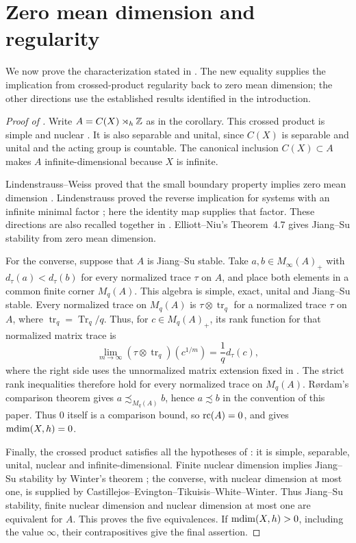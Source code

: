 \section{Zero mean dimension and regularity}
\label{sec:regularity-proof}

We now prove the characterization stated in .
The new equality supplies the implication from crossed-product
regularity back to zero mean dimension; the other directions use the
established results identified in the introduction.

\begin{proof}[Proof of ]
Write $A=C(X)\rtimes_h\mathbb Z$ as in the corollary. This crossed product
is simple and nuclear
\cite[Section~3]{ElliottNiu2017}. It is also separable and unital, since
\(C(X)\) is separable and unital and the acting group is countable.
The canonical inclusion \(C(X)\subset A\) makes \(A\)
infinite-dimensional because \(X\) is infinite.

Lindenstrauss--Weiss proved that the small boundary property implies
zero mean dimension \cite[Theorem~5.4]{LindenstraussWeiss2000}.
Lindenstrauss proved the reverse implication for systems with an infinite
minimal factor \cite[Theorem~6.2]{Lindenstrauss1999}; here the identity
map supplies that factor. These directions are also recalled together
in \cite[Theorem~2.3]{ElliottNiu2017}. Elliott--Niu's Theorem~4.7 gives
Jiang--Su stability from zero mean dimension.

For the converse, suppose that \(A\) is Jiang--Su stable. Take
\(a,b\in M_\infty(A)_+\) with \(d_\tau(a)<d_\tau(b)\) for every
normalized trace \(\tau\) on \(A\), and place both elements in a common
finite corner \(M_q(A)\). This algebra is simple, exact, unital and
Jiang--Su stable. Every normalized trace on \(M_q(A)\) is
\(\tau\otimes\operatorname{tr}_q\) for a normalized trace \(\tau\) on
\(A\), where \(\operatorname{tr}_q=\operatorname{Tr}_q/q\). Thus, for
\(c\in M_q(A)_+\), its rank function for that normalized matrix trace is
\[
\lim_{m\to\infty}(\tau\otimes\operatorname{tr}_q)(c^{1/m})
   =\frac1q d_\tau(c),
\]
where the right side uses the unnormalized matrix extension fixed in
. The strict rank inequalities therefore
hold for every normalized trace on \(M_q(A)\). R\o rdam's comparison
theorem \cite[Corollary~4.6]{Rordam2004} gives
\(a\precsim_{M_q(A)}b\), hence \(a\precsim b\) in the convention of this
paper. Thus \(0\) itself is a comparison bound, so \(\operatorname{rc}(A)=0\), and
 gives
\(\operatorname{mdim}(X,h)=0\).

Finally, the crossed product satisfies all the hypotheses of
\cite[Theorems~A and~B]{CastillejosEvingtonTikuisisWhiteWinter2021}:
it is simple, separable, unital, nuclear and infinite-dimensional.
Finite nuclear dimension implies Jiang--Su stability by Winter's theorem
\cite{Winter2012}; the converse, with nuclear dimension at most one,
is supplied by Castillejos--Evington--Tikuisis--White--Winter.
Thus Jiang--Su stability, finite nuclear dimension and nuclear dimension
at most one are equivalent for $A$. This proves the five equivalences.
If $\operatorname{mdim}(X,h)>0$, including the value $\infty$, their contrapositives
give the final assertion.
\end{proof}
